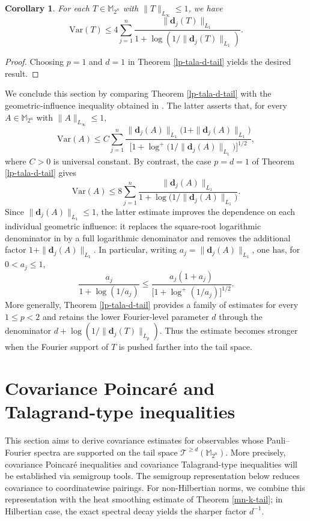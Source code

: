 \documentclass{amsbook}
\newtheorem{corollary}[theorem]{Corollary}
\theoremstyle{definition}
\theoremstyle{remark}
\numberwithin{section}{chapter}
\numberwithin{equation}{chapter}
\newcommand{\M}{\mathbb{M}}
\newcommand{\1}{\mathbf{1}}
\newcommand{\dc}{\mathbf{d}}
\begin{document}
\begin{corollary}\label{cov-l1-tala-d-tail-d-1}
For each $T\in \mathbb{M}_{2^n}$ with $\|T\|_{L_\infty}\leq1$, we have
\[
\mathrm{Var}(T)\leq4\sum_{j=1}^{n}\frac{\|\dc_{j}(T)\|_{L_{1}}}{1+\log\left(1/\|\dc_{j}(T)\|_{L_{1}}\right)}.
\]
\end{corollary}
\begin{proof}
Choosing $p=1$ and $d=1$ in Theorem \ref{lp-tala-d-tail} yields the desired result.
\end{proof}

We conclude this section by comparing Theorem \ref{lp-tala-d-tail} with the geometric-influence inequality obtained in \cite[Theorem 3.2]{RWZ2024}.  The latter asserts that, for every
$A\in\mathbb{M}_{2^n}$ with $\|A\|_{L_\infty}\leq1$,
\[
\mathrm{Var}(A)\leq C\sum_{j=1}^{n}
 \frac{\|\dc_{j}(A)\|_{L_1}\bigl(1+\|\dc_{j}(A)\|_{L_1}\bigr)}
 {\bigl[1+\log^+\bigl(1/\|\dc_{j}(A)\|_{L_1}\bigr)\bigr]^{1/2}},
\]
where $C>0$ is universal constant.  By contrast, the case $p=d=1$
of Theorem \ref{lp-tala-d-tail} gives
\[
\mathrm{Var}(A)
 \leq 8\sum_{j=1}^n
 \frac{\|\dc_{j}(A)\|_{L_1}}
 {1+\log\bigl(1/\|\dc_{j}(A)\|_{L_1}\bigr)}.
\]
Since $\|\dc_{j}(A)\|_{L_1}\leq1$, the latter estimate improves the
dependence on each individual geometric influence: it replaces the
square-root logarithmic denominator in \cite{RWZ2024} by a full
logarithmic denominator and removes the additional factor
$1+\|\dc_{j}(A)\|_{L_1}$.  In particular, writing
$a_j=\|\dc_{j}(A)\|_{L_1}$, one has, for $0<a_j\leq1$,
\[
\frac{a_j}{1+\log(1/a_j)}
 \leq
\frac{a_j(1+a_j)}
 {\bigl[1+\log^+(1/a_j)\bigr]^{1/2}}.
\]
More generally, Theorem \ref{lp-tala-d-tail} provides a family of estimates for every
$1\leq p<2$ and retains the lower Fourier-level parameter $d$ through
the denominator $d+\log\left(1/\|\dc_{j}(T)\|_{L_p}\right)$. Thus the estimate becomes stronger when the Fourier support of $T$ is pushed farther into the tail space. 

\section{Covariance Poincar\'e and Talagrand-type inequalities}\label{covariance-poincare-for-tail}

This section aims to derive covariance estimates for observables whose Pauli--Fourier spectra are supported on the tail space $\mathcal{T}^{\geq d}(\M_{2^{n}})$. More precisely, covariance Poincar\'e inequalities and covariance Talagrand-type inequalities will be established via semigroup tools. The semigroup representation below reduces covariance to coordinatewise pairings. For non-Hilbertian norms, we combine this representation with the heat smoothing estimate of Theorem \ref{mn-k-tail}; in Hilbertian case, the exact spectral decay yields the sharper factor $d^{-1}$.
\end{document}
